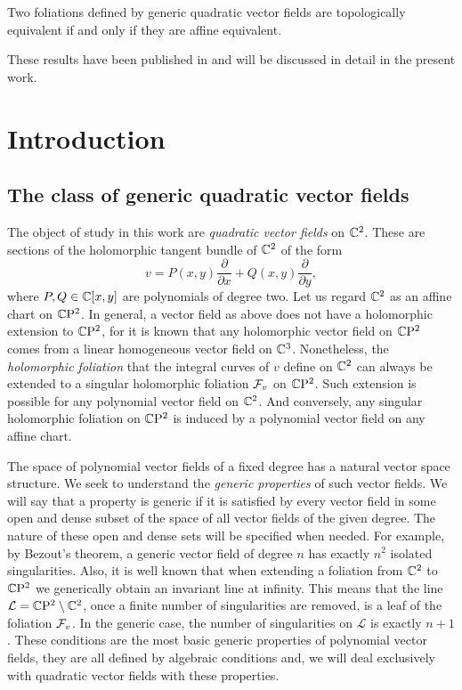 \documentclass[phd,tocprelim]{cornell}
\begin{document}
\begin{prefthm}
Two foliations defined by generic quadratic vector fields are topologically equivalent if and only if they are affine equivalent.  
\end{prefthm}  

These results have been published in \cite{TwinVectorFields,UtmostRigidity} and will be discussed in detail in the present work.


\pagestyle{cornell} \addtolength{\parskip}{0.5\baselineskip}





\chapter{Introduction}

\section{The class of generic quadratic vector fields}

The object of study in this work are \textit{quadratic vector fields} on $\mathbb{C}^2$. These are sections of the holomorphic tangent bundle of $\mathbb{C}^2$ of the form 
 \[ v = P(x,y)\frac{\partial}{\partial x} + Q(x,y)\frac{\partial}{\partial y}, \]
where $P,Q\in\mathbb{C}[x,y]$ are polynomials of degree two. Let us regard $\mathbb{C}^2$ as an affine chart on $\mathbb{C}\mathrm{P}^2$. In general, a vector field as above does not have a holomorphic extension to $\mathbb{C}\mathrm{P}^2$, for it is known that any holomorphic vector field on $\mathbb{C}\mathrm{P}^2$ comes from a linear homogeneous vector field on $\mathbb{C}^3$. Nonetheless, the \textit{holomorphic foliation} that the integral curves of $v$ define on $\mathbb{C}^2$ can always be extended to a singular holomorphic foliation $\mathcal{F}_v$ on $\mathbb{C}\mathrm{P}^2$. Such extension is possible for any polynomial vector field on $\mathbb{C}^2$. And conversely, any singular holomorphic foliation on $\mathbb{C}\mathrm{P}^2$ is induced by a polynomial vector field on any affine chart.

The space of polynomial vector fields of a fixed degree has a natural vector space structure. We seek to understand the \textit{generic properties} of such vector fields. We will say that a property is generic if it is satisfied by every vector field in some open and dense subset of the space of all vector fields of the given degree. The nature of these open and dense sets will be specified when needed. For example, by Bezout's theorem, a generic vector field of degree $n$ has exactly $n^2$ isolated singularities. Also, it is well known that when extending a foliation from $\mathbb{C}^2$ to $\mathbb{C}\mathrm{P}^2$ we generically obtain an invariant line at infinity. This means that the line $\mathcal{L}=\mathbb{C}\mathrm{P}^2\setminus\mathbb{C}^2$, once a finite number of singularities are removed, is a leaf of the foliation $\mathcal{F}_v$. In the generic case, the number of singularities on $\mathcal{L}$ is exactly $n+1$. These conditions are the most basic generic properties of polynomial vector fields, they are all defined by algebraic conditions and, we will deal exclusively with quadratic vector fields with these properties. 
\end{document}
